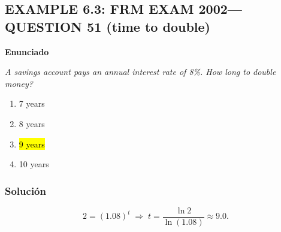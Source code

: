 ﻿\subsection{EXAMPLE 6.3: FRM EXAM 2002---QUESTION 51 (time to double)}

\textbf{Enunciado}

\emph{A savings account pays an annual interest rate of 8\%. How long to double money?}
\begin{enumerate}[label=\alph*.]
\item 7 years
\item 8 years
\item \hl{9 years}
\item 10 years
\end{enumerate}

\subsubsection*{Solución}


\[
2=(1.08)^t \;\Rightarrow\; t=\frac{\ln 2}{\ln(1.08)}\approx 9.0.
\]











